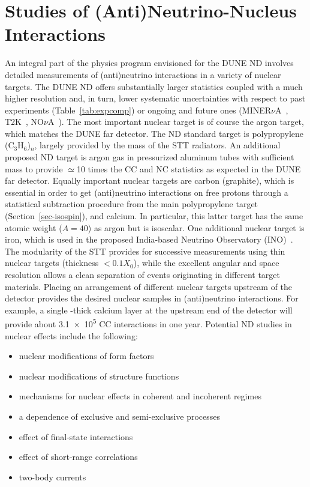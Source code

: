 \section{Studies of (Anti)Neutrino-Nucleus Interactions} 
\label{sec-nuclear} 
An integral part of the physics program envisioned for the DUNE ND
involves detailed measurements of (anti)neutrino interactions in a
variety of nuclear targets.  The DUNE ND offers substantially
larger statistics coupled with a much higher resolution and, in turn,
lower systematic uncertainties with respect to past experiments
(Table~\ref{tab:expcomp}) or ongoing and future ones
(MINER$\nu$A~\cite{Osmanov:2011ig}, T2K~\cite{Abe:2011ks},
NO$\nu$A~\cite{Ayres:2007tu}).  The most important nuclear target is
of course the argon target, which matches the DUNE far detector.
The ND standard target is polypropylene
(C$_3$H$_6$)$_n$, largely provided by the mass of the STT radiators.
%
An additional proposed ND target is argon gas in pressurized aluminum
tubes with sufficient mass to provide $\simeq$10 times the \numu CC and
NC statistics as expected in the DUNE far detector.  Equally important
nuclear targets are carbon (graphite), which is essential in order to
get (anti)neutrino interactions on free protons through a statistical
subtraction procedure from the main polypropylene target 
(Section~\ref{sec-isospin}), and calcium.  In particular, this latter
target has the same atomic weight ($A=40$) as argon but is
isoscalar. One additional nuclear target is iron, which is used in the
proposed India-based Neutrino Observatory
(INO)~\cite{Mondal:2012fn}. %
The modularity of the STT provides for successive measurements using
thin nuclear targets (thickness $< 0.1 X_0$), while the excellent
angular and space resolution allows a clean separation of events
originating in different target materials.  Placing an arrangement of
different nuclear targets upstream of the detector
provides the desired nuclear samples in (anti)neutrino interactions.
For example, a single -thick calcium layer at the upstream 
end of the detector will provide  
about \num{3.1e5} \numu CC interactions in one year. 
%
Potential ND studies in nuclear effects include the following: 
%
\begin{itemize}%
\item nuclear modifications of form factors
\item nuclear modifications of structure functions
\item mechanisms for nuclear effects in coherent and incoherent regimes
\item a dependence of exclusive and semi-exclusive processes
\item effect of final-state interactions
\item effect of short-range correlations
\item two-body currents
\end{itemize}
